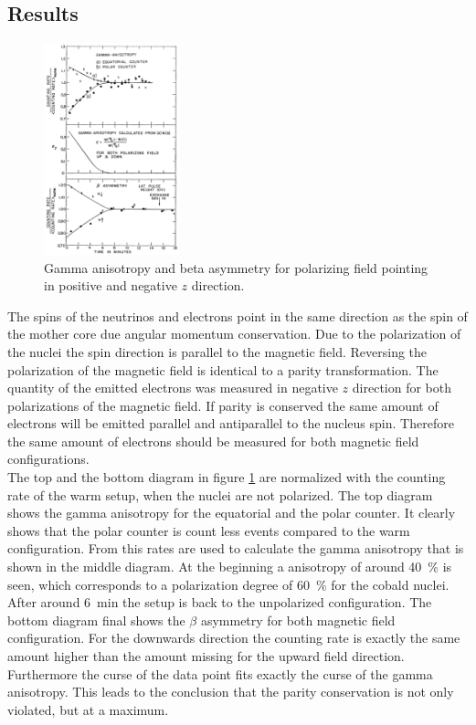\subsection{Results}
\begin{figure}
    \includegraphics[width=0.35\textwidth]{graphics/Wu_result.png}
    \caption{Gamma anisotropy and beta asymmetry for polarizing field pointing in positive and negative $z$ direction. \cite{wu}}
		\label{fig:Wu_result}
  \end{figure}
  \FloatBarrier
The spins of the neutrinos and electrons point in the same direction as the spin of the mother core due angular momentum conservation.
Due to the polarization of the nuclei the spin direction is parallel to the magnetic field.
Reversing the polarization of the magnetic field is identical to a parity transformation. The quantity of the emitted electrons was measured in negative $z$ direction for both polarizations of the magnetic field. If parity is conserved the same amount of electrons will be emitted parallel and antiparallel to the nucleus spin. Therefore the same amount of electrons should be measured for both magnetic field configurations.\\
The top and the bottom diagram in figure \ref{fig:Wu_result} are normalized with the counting rate of the warm setup, when the nuclei are not polarized. The top diagram shows the gamma anisotropy for the equatorial and the polar counter. It clearly shows that the polar counter is count less events compared to the warm configuration. From this rates are used to calculate the gamma anisotropy that is shown in the middle diagram. At the beginning a anisotropy of around \SI{40}{\percent} is seen, which corresponds to a polarization  degree of \SI{60}{\percent} for the cobald nuclei. After around \SI{6}{\minute} the setup is back to the unpolarized configuration. The bottom diagram final shows the $\beta$ asymmetry for both magnetic field configuration. For the downwards direction the counting rate is exactly the same amount higher than the amount missing for the upward field direction. Furthermore the curse of the data point fits exactly the curse of the gamma anisotropy. This leads to the conclusion that the parity conservation is not only violated, but at a maximum.\\
